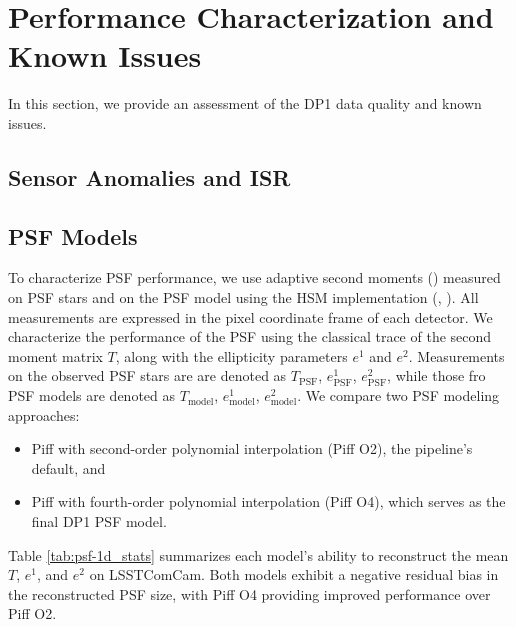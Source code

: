 \section{Performance Characterization and Known Issues
\label{sec:performance}}
%
In this section, we provide an assessment of the \gls{DP1} data quality and known issues.
%

\subsection{Sensor Anomalies and ISR}
\label{ssec:sensor_anomalies}



\subsection{PSF Models
\label{ssec:psf_models}}
To characterize \gls{PSF}  performance, we use adaptive second moments (\citealt{2002AJ....123..583B}) measured on \gls{PSF} stars and on the PSF model using the \gls{HSM} implementation (\citealt{2003MNRAS.343..459H}, \citealt{2005MNRAS.361.1287M}).
All measurements are expressed in the pixel coordinate frame of each detector.
We characterize the performance of the PSF using the classical trace of the  second moment matrix $T$, along with the ellipticity parameters $e^1$ and $e^2$.
Measurements on the observed PSF stars are are denoted as  $T_{\text{PSF}}$, $e^1_{\text{PSF}}$,  $e^2_{\text{PSF}}$, while those fro PSF models are denoted as  $T_{\text{model}}$, $e^1_{\text{model}}$, $e^2_{\text{model}}$.
We compare two PSF modeling approaches:
\begin{itemize}
\item Piff with second-order polynomial interpolation (Piff O2), the pipeline's default, and
\item Piff with fourth-order polynomial interpolation (Piff O4), which serves as the final DP1 PSF model.	
\end{itemize}
Table \ref{tab:psf-1d_stats} summarizes each model’s ability to reconstruct the mean $T$, $e^1$, and $e^2$ on  \gls{LSSTComCam}. 
Both models exhibit a negative residual bias in the reconstructed PSF size, with Piff O4 providing improved performance over Piff O2.


